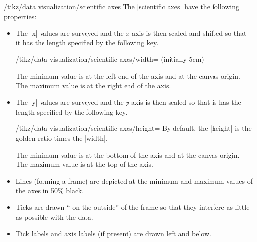 \begin{key}{/tikz/data visualization/scientific axes}
  The |scientific axes| have the following properties:
  \begin{itemize}
  \item The |x|-values are surveyed and the $x$-axis is then scaled
    and shifted so  that it has the length specified by the following key.
    \begin{key}{/tikz/data visualization/scientific
        axes/width= (initially 5cm)}
    \end{key}
    The minimum value is at the left end of the axis and at the canvas
    origin. The maximum value is at the right end of the axis.
  \item The |y|-values are surveyed and the $y$-axis is then scaled so
    that is has the length specified by the following key.
    \begin{key}{/tikz/data visualization/scientific
        axes/height=}
      By default, the |height| is the golden ratio times the |width|.
    \end{key}
    The minimum value is at the bottom of the axis and at the canvas
    origin. The maximum value is at the top of the axis.
  \item Lines (forming a frame) are depicted at the minimum and
    maximum values of the axes in 50\% black.
  \item Ticks are drawn `` on the outside'' of the frame so that they
    interfere as little as possible with the data.
  \item Tick labels and axis labels (if present) are drawn left and
    below.
  \end{itemize}
\end{key}

